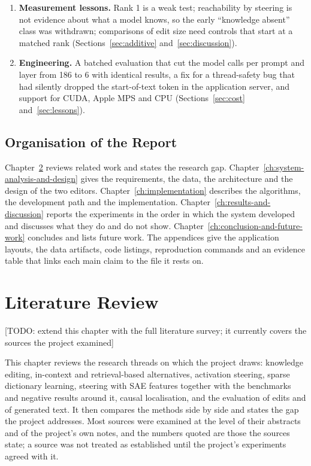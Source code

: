 \documentclass[12pt,a4paper]{report}
\newcommand{\todo}[1]{{\color{red}[TODO: #1]}}
\begin{document}
\begin{enumerate}
  \item \textbf{Measurement lessons.} Rank 1 is a weak test; reachability by steering is not evidence about what a model knows, so the early ``knowledge absent'' class was withdrawn; comparisons of edit size need controls that start at a matched rank (Sections~\ref{sec:additive} and~\ref{sec:discussion}).
  \item \textbf{Engineering.} A batched evaluation that cut the model calls per prompt and layer from 186 to 6 with identical results, a fix for a thread-safety bug that had silently dropped the start-of-text token in the application server, and support for CUDA, Apple MPS and CPU (Sections~\ref{sec:cost} and~\ref{sec:lessons}).
\end{enumerate}

\section{Organisation of the Report}

Chapter~\ref{ch:literature-review} reviews related work and states the research gap. Chapter~\ref{ch:system-analysis-and-design} gives the requirements, the data, the architecture and the design of the two editors. Chapter~\ref{ch:implementation} describes the algorithms, the development path and the implementation. Chapter~\ref{ch:results-and-discussion} reports the experiments in the order in which the system developed and discusses what they do and do not show. Chapter~\ref{ch:conclusion-and-future-work} concludes and lists future work. The appendices give the application layouts, the data artifacts, code listings, reproduction commands and an evidence table that links each main claim to the file it rests on.

\chapter{Literature Review}\label{ch:literature-review}

\todo{extend this chapter with the full literature survey; it currently covers the sources the project examined}

This chapter reviews the research threads on which the project draws: knowledge editing, in-context and retrieval-based alternatives, activation steering, sparse dictionary learning, steering with SAE features together with the benchmarks and negative results around it, causal localisation, and the evaluation of edits and of generated text. It then compares the methods side by side and states the gap the project addresses. Most sources were examined at the level of their abstracts and of the project's own notes, and the numbers quoted are those the sources state; a source was not treated as established until the project's experiments agreed with it.
\end{document}

